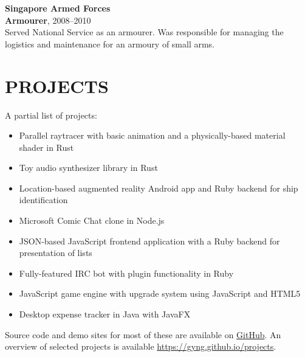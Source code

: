 \documentclass[line, margin]{res}
\begin{document}
\begin{resume}
        \textbf{Singapore Armed Forces} \\
        \textbf{Armourer}, 2008--2010 \\
        Served National Service as an armourer. Was responsible for managing the logistics and maintenance for an armoury of small arms.

    \section{PROJECTS}
        A partial list of projects: \\
        \begin{itemize}[leftmargin=*]
        \item Parallel raytracer with basic animation and a physically-based material shader in Rust
        \item Toy audio synthesizer library in Rust
        \item Location-based augmented reality Android app and Ruby backend for ship identification
        \item Microsoft Comic Chat clone in Node.js
        \item \textsc{JSON}-based JavaScript frontend application with a Ruby backend for presentation of lists
        \item \textsc Fully-featured IRC bot with plugin functionality in Ruby
        \item JavaScript game engine with upgrade system using JavaScript and HTML5
        \item Desktop expense tracker in Java with JavaFX
        \end{itemize}

        Source code and demo sites for most of these are available on \href{http://github.com/gyng}{GitHub}. An overview of selected projects is available \href{https://gyng.github.io/projects}{https://gyng.github.io/projects}.

\end{resume}
\end{document}
